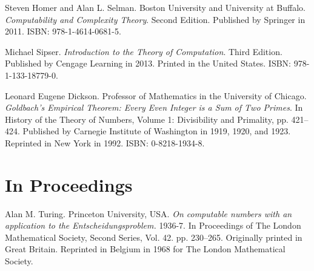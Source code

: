 \begin{thebibliography}{9}



Steven Homer and Alan L. Selman. Boston University and University at Buffalo.
\emph{Computability and Complexity Theory}. Second Edition. Published by
Springer in 2011. ISBN: 978-1-4614-0681-5.

\backrefprint


Michael Sipser. \emph{Introduction to the Theory of Computation}. Third
Edition. Published by Cengage Learning in 2013. Printed in the United States.
ISBN: 978-1-133-18779-0.

\backrefprint




Leonard Eugene Dickson. Professor of Mathematics in the University of Chicago.
\emph{Goldbach's Empirical Theorem: Every Even Integer is a Sum of Two Primes}.
In History of the Theory of Numbers, Volume 1: Divisibility and Primality, pp.
421--424.  Published by Carnegie Institute of Washington in 1919, 1920, and
1923.  Reprinted in New York in 1992. ISBN: 0-8218-1934-8.

\backrefprint

\section*{In Proceedings}


Alan M. Turing. Princeton University, USA. \emph{On computable numbers with an
application to the Entscheidungsproblem.} 1936-7. In Proceedings of The London
Mathematical Society, Second Series, Vol. 42. pp. 230–265. Originally printed
in Great Britain. Reprinted in Belgium in 1968 for The London Mathematical
Society.

\backrefprint




\end{thebibliography}
